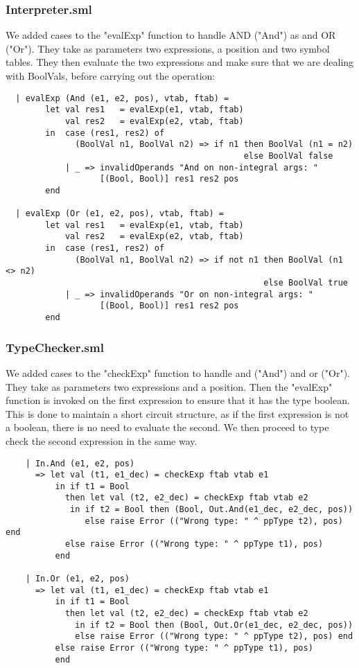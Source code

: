 \documentclass[12pt]{article}
\begin{document}
\subsubsection{Interpreter.sml}
We added cases to the "evalExp" function to handle AND ("And") as and OR ("Or"). They take as parameters two expressions, a position and two symbol tables. They then evaluate the two expressions and make sure that we are dealing with BoolVals, before carrying out the operation:
\begin{verbatim}
  | evalExp (And (e1, e2, pos), vtab, ftab) =
        let val res1   = evalExp(e1, vtab, ftab)
            val res2   = evalExp(e2, vtab, ftab)
        in  case (res1, res2) of
              (BoolVal n1, BoolVal n2) => if n1 then BoolVal (n1 = n2) 
                                                else BoolVal false
            | _ => invalidOperands "And on non-integral args: "
                   [(Bool, Bool)] res1 res2 pos
        end

  | evalExp (Or (e1, e2, pos), vtab, ftab) =
        let val res1   = evalExp(e1, vtab, ftab)
            val res2   = evalExp(e2, vtab, ftab)
        in  case (res1, res2) of
              (BoolVal n1, BoolVal n2) => if not n1 then BoolVal (n1 <> n2) 
                                                    else BoolVal true
            | _ => invalidOperands "Or on non-integral args: " 
                   [(Bool, Bool)] res1 res2 pos
        end
\end{verbatim}
\subsubsection{TypeChecker.sml}
We added cases to the "checkExp" function to handle and ("And") and or ("Or"). They take as parameters two expressions and a position. Then the "evalExp" function is invoked on the first expression to ensure that it has the type boolean. This is done to maintain a short circuit structure, as if the first expression is not a boolean, there is no need to evaluate the second. We then proceed to type check the second expression in the same way. 
\begin{verbatim}
    | In.And (e1, e2, pos)
      => let val (t1, e1_dec) = checkExp ftab vtab e1
          in if t1 = Bool
            then let val (t2, e2_dec) = checkExp ftab vtab e2
             in if t2 = Bool then (Bool, Out.And(e1_dec, e2_dec, pos))
                else raise Error (("Wrong type: " ^ ppType t2), pos) end
            else raise Error (("Wrong type: " ^ ppType t1), pos)
          end

    | In.Or (e1, e2, pos)
      => let val (t1, e1_dec) = checkExp ftab vtab e1
          in if t1 = Bool
            then let val (t2, e2_dec) = checkExp ftab vtab e2
              in if t2 = Bool then (Bool, Out.Or(e1_dec, e2_dec, pos))
              else raise Error (("Wrong type: " ^ ppType t2), pos) end
          else raise Error (("Wrong type: " ^ ppType t1), pos)
          end
\end{verbatim}
\end{document}
